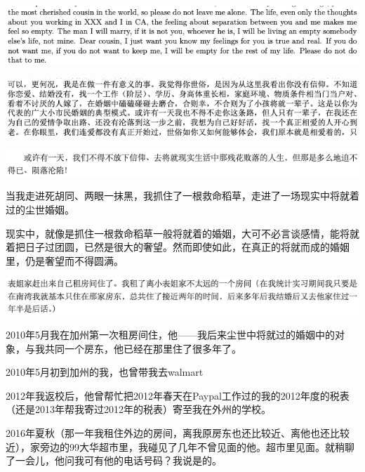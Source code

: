 \documentclass[9pt, b5paper]{article}
\begin{document}
\begin{center}
\includegraphics[width=.9\linewidth]{./pic/backups_plans_20210423_201706.png}
\end{center}

\begin{center}
\includegraphics[width=.9\linewidth]{./pic/backups_plans_20210424_095212.png}
\end{center}

\begin{center}
\includegraphics[width=.9\linewidth]{./pic/backups_plans_20210424_095046.png}
\end{center}

当我走进死胡同、两眼一抹黑，我抓住了一根救命稻草，走进了一场现实中将就着过的尘世婚姻。

现实中，就像是抓住一根救命稻草一般将就着的婚姻，大可不必言谈感情，能将就着把日子过团圆，已然是很大的奢望。然而即使如此，在真正的将就而成的婚姻里，仍是奢望而不得圆满。

\begin{center}
\includegraphics[width=.9\linewidth]{./pic/backups_plans_20210423_202941.png}
\end{center}

2010年5月我在加州第一次租房间住，他——我后来尘世中将就过的婚姻中的对象，与我共同一个房东，他已经在那里住了很多年了。 

2010年5月初到加州的我，也曾带我去walmart

2012年我返校后，他曾帮忙把2012年春天在Paypal工作过的我的2012年度的税表（还是2013年帮我寄过2012年的税表）寄至我在外州的学校。

2016年夏秋（那一年我租住外边的房间，离我原房东也还比较近、离他也还比较近），家旁边的99大华超市里，我碰见了几年不曾见面的他。超市里见面。就稍聊了一会儿，他问我可有他的电话号码？我说是的。
\end{document}
